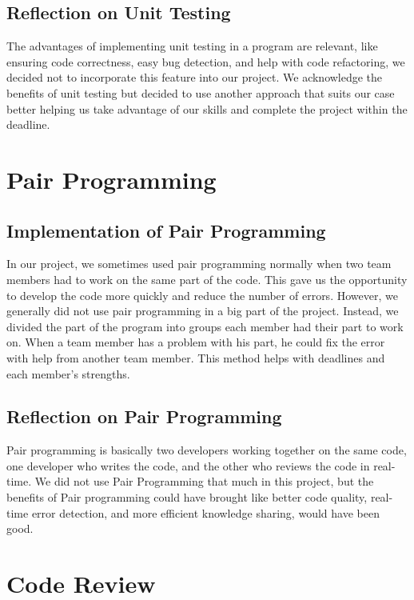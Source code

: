 \documentclass[12pt]{report}
\begin{document}
\subsection*{Reflection on Unit Testing}

The advantages of implementing unit testing in a program are relevant, like ensuring code correctness, easy bug detection, 
and help with code refactoring, we decided not to incorporate this feature into our project. We acknowledge the benefits of 
unit testing but decided to use another approach that suits our case better helping us take advantage of our skills and complete 
the project within the deadline.

\section{Pair Programming}
\subsection*{Implementation of Pair Programming}

In our project, we sometimes used pair programming normally when two team members had to work on the same part of the code. 
This gave us the opportunity to develop the code more quickly and reduce the number of errors. However, we generally did not 
use pair programming in a big part of the project. Instead, we divided the part of the program into groups each member had 
their part to work on. When a team member has a problem with his part, he could fix the error with help from another team member. 
This method helps with deadlines and each member's strengths.

\subsection*{Reflection on Pair Programming}

Pair programming is basically two developers working together on the same code, one developer who writes the code, 
and the other who reviews the code in real-time. We did not use Pair Programming that much in this project, but the 
benefits of Pair programming could have brought like better code quality, real-time error detection, and more 
efficient knowledge sharing, would have been good.

\section{Code Review}
\end{document}
